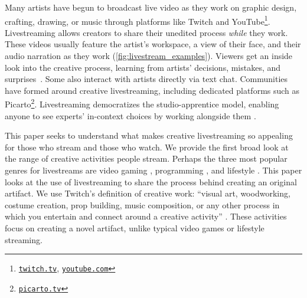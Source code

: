 Many artists have begun to broadcast live video as they work on graphic design, crafting, drawing, or music through platforms like Twitch and YouTube\footnote{\href{www.twitch.tv}{\nolinkurl{twitch.tv}}, \href{www.youtube.com}{\nolinkurl{youtube.com}}}. Livestreaming allows creators to share their unedited process \emph{while} they work. These videos usually feature the artist's workspace, %
a view of their face,
and their audio narration as they work (\autoref{fig:livestream_examples}). Viewers get an inside look into the creative process, learning from artists' decisions, mistakes, and surprises~\cite{Faas2018, Haimson2017}.  
Some also interact with artists directly via text chat. 
Communities have formed around creative livestreaming, including dedicated platforms such as Picarto\footnote{\href{www.picarto.tv}{\nolinkurl{picarto.tv}}}.
Livestreaming democratizes the studio-apprentice model, enabling anyone to see experts' in-context choices by working alongside them \cite{Schon1985}. 

This paper seeks to understand what makes creative livestreaming so appealing for those who stream and those who watch.
We provide the first broad look at the range of creative activities people stream. 
Perhaps the three most popular genres for livestreams are video gaming \cite{Pellicone2017, Lessel2017, Sjoblom2017, Hamilton2014}, programming \cite{Faas2018, Haaranen2017}, and lifestyle  \cite{Lu2018a, Tang2016}. This paper looks at the use of livestreaming to share the process behind creating an original artifact. We use Twitch's definition of creative work: ``visual art, woodworking, costume creation, prop building, music composition, or any other process in which you entertain and connect around a creative activity'' \cite{Moorier2015}. These activities focus on creating a novel artifact, unlike typical video games or lifestyle streaming.

